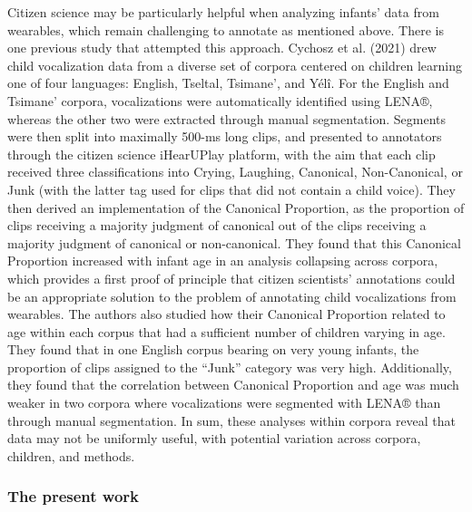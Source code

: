 \documentclass[
  english,
  ,man]{apa6}
\begin{document}
Citizen science may be particularly helpful when analyzing infants' data from wearables, which remain challenging to annotate as mentioned above. There is one previous study that attempted this approach. Cychosz et al. (2021) drew child vocalization data from a diverse set of corpora centered on children learning one of four languages: English, Tseltal, Tsimane', and Yélî. For the English and Tsimane' corpora, vocalizations were automatically identified using LENA®, whereas the other two were extracted through manual segmentation. Segments were then split into maximally 500-ms long clips, and presented to annotators through the citizen science iHearUPlay platform, with the aim that each clip received three classifications into Crying, Laughing, Canonical, Non-Canonical, or Junk (with the latter tag used for clips that did not contain a child voice). They then derived an implementation of the Canonical Proportion, as the proportion of clips receiving a majority judgment of canonical out of the clips receiving a majority judgment of canonical or non-canonical. They found that this Canonical Proportion increased with infant age in an analysis collapsing across corpora, which provides a first proof of principle that citizen scientists' annotations could be an appropriate solution to the problem of annotating child vocalizations from wearables. The authors also studied how their Canonical Proportion related to age within each corpus that had a sufficient number of children varying in age. They found that in one English corpus bearing on very young infants, the proportion of clips assigned to the ``Junk'' category was very high. Additionally, they found that the correlation between Canonical Proportion and age was much weaker in two corpora where vocalizations were segmented with LENA® than through manual segmentation. In sum, these analyses within corpora reveal that data may not be uniformly useful, with potential variation across corpora, children, and methods.

\hypertarget{the-present-work}{%
\subsubsection{The present work}\label{the-present-work}}
\end{document}
